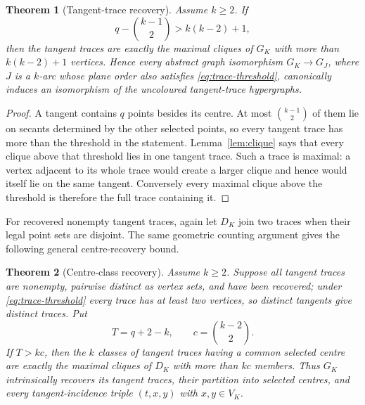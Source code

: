 \documentclass[11pt]{article}
\newtheorem{theorem}{Theorem}[section]
\theoremstyle{definition}
\theoremstyle{remark}
\begin{document}
\begin{theorem}[Tangent-trace recovery]\label{thm:traces}
Assume $k\ge2$. If
\begin{equation}
  q-\binom{k-1}{2}>k(k-2)+1,
  \label{eq:trace-threshold}
\end{equation}
then the tangent traces are exactly the maximal cliques of $G_K$ with more
than $k(k-2)+1$ vertices.  Hence every abstract graph isomorphism
$G_K\to G_J$, where $J$ is a $k$-arc whose plane order also satisfies
\eqref{eq:trace-threshold}, canonically induces an isomorphism of the
uncoloured tangent-trace hypergraphs.
\end{theorem}

\begin{proof}
A tangent contains $q$ points besides its centre.  At most
$\binom{k-1}{2}$ of them lie on secants determined by the other selected
points, so every tangent trace has more than the threshold in the statement.
Lemma~\ref{lem:clique} says that every clique above that threshold lies in
one tangent trace.  Such a trace is maximal: a vertex adjacent to its whole
trace would create a larger clique and hence would itself lie on the same
tangent.  Conversely every maximal clique above the threshold is therefore
the full trace containing it.
\end{proof}

For recovered nonempty tangent traces, again let $D_K$ join two traces
when their legal point sets are disjoint. The same geometric counting
argument gives the following general centre-recovery bound.

\begin{theorem}[Centre-class recovery]\label{thm:centres}
Assume $k\ge2$. Suppose all tangent traces are nonempty, pairwise distinct as vertex
sets, and have been recovered; under \eqref{eq:trace-threshold} every
trace has at least two vertices, so distinct tangents give distinct
traces. Put
\[
  T=q+2-k,\qquad c=\binom{k-2}{2}.
\]
If $T>kc$, then the $k$ classes of tangent traces having a common selected
centre are exactly the maximal cliques of $D_K$ with more than $kc$
members.  Thus $G_K$ intrinsically recovers its tangent traces, their
partition into selected centres, and every tangent-incidence triple
$(t,x,y)$ with $x,y\in V_K$.
\end{theorem}
\end{document}
